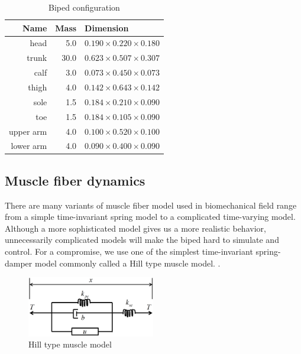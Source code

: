 \documentclass{acm_proc_article-sp}
\begin{document}
\begin{table}[h!]
\centering
  \begin{tabular}{rrl}
  Name      & Mass  & Dimension                \\
  \hline
  head      & 5.0   & $0.190 \times 0.220 \times 0.180$  \\
  trunk     & 30.0  & $0.623 \times 0.507 \times 0.307$  \\
  calf      & 3.0   & $0.073 \times 0.450 \times 0.073$  \\
  thigh     & 4.0   & $0.142 \times 0.643 \times 0.142$  \\
  sole      & 1.5   & $0.184 \times 0.210 \times 0.090$  \\
  toe       & 1.5   & $0.184 \times 0.105 \times 0.090$  \\
  upper arm & 4.0   & $0.100 \times 0.520 \times 0.100$  \\
  lower arm & 4.0   & $0.090 \times 0.400 \times 0.090$  \\
  \hline
\end{tabular}
\caption{Biped configuration}
\end{table}


\subsection{Muscle fiber dynamics}

There are many variants of muscle fiber model used in biomechanical field range
from a simple time-invariant spring model to a complicated time-varying model. \cite{25733}
Although a more sophisticated model gives us a more realistic behavior, unnecessarily
complicated models will make the biped hard to simulate and control.
For a compromise, we use one of the simplest time-invariant spring-damper model commonly called
a Hill type muscle model. \cite{hill}.

\begin{figure}[h!]
  \centering
  \includegraphics[width=2.2in]{musclemodel}
  \caption{Hill type muscle model}
\end{figure}
\end{document}
